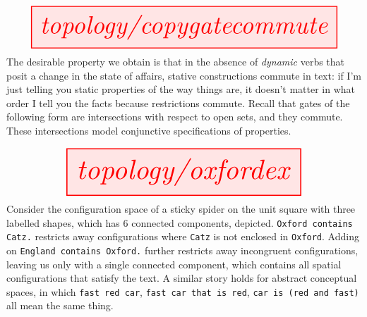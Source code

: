 \[\resizebox{\textwidth}{!}{\tikzfig{topology/copygatecommute}}\]
The desirable property we obtain is that in the absence of \emph{dynamic} verbs that posit a change in the state of affairs, stative constructions commute in text: if I'm just telling you static properties of the way things are, it doesn't matter in what order I tell you the facts because restrictions commute. Recall that gates of the following form are intersections with respect to open sets, and they commute. These intersections model conjunctive specifications of properties.

\begin{example}
\[\resizebox{0.8\textwidth}{!}{\tikzfig{topology/oxfordex}}\]
Consider the configuration space of a sticky spider on the unit square with three labelled shapes, which has 6 connected components, depicted. \texttt{Oxford contains Catz.} restricts away configurations where \texttt{Catz} is not enclosed in \texttt{Oxford}. Adding on \texttt{England contains Oxford.} further restricts away incongruent configurations, leaving us only with a single connected component, which contains all spatial configurations that satisfy the text. A similar story holds for abstract conceptual spaces, in which \texttt{fast red car}, \texttt{fast car that is red}, \texttt{car is (red and fast)} all mean the same thing.
\end{example}

\clearpage

